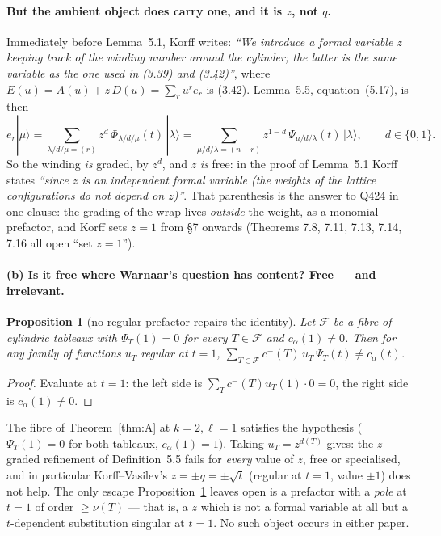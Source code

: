 \documentclass[11pt]{article}
\newtheorem{proposition}[theorem]{Proposition}
\theoremstyle{definition}
\begin{document}
\paragraph{But the ambient object does carry one, and it is $z$, not $q$.}
Immediately before Lemma~5.1, Korff writes: \emph{``We introduce a formal variable $z$
keeping track of the winding number around the cylinder; the latter is the same
variable as the one used in (3.39) and (3.42)''}, where
$E(u)=A(u)+z\,D(u)=\sum_r u^r e_r$ is (3.42).  Lemma~5.5, equation~(5.17), is then
\[
  e_r|\mu\rangle=\sum_{\lambda/d/\mu=(r)} z^{d}\,\Phi_{\lambda/d/\mu}(t)\,|\lambda\rangle
  =\sum_{\mu/d/\lambda=(n-r)} z^{1-d}\,\Psi_{\mu/d/\lambda}(t)\,|\lambda\rangle ,
  \qquad d\in\{0,1\}.
\]
So the winding \emph{is} graded, by $z^d$, and $z$ \emph{is} free: in the proof of
Lemma~5.1 Korff states \emph{``since $z$ is an independent formal variable (the weights
of the lattice configurations do not depend on $z$)''}.  That parenthesis is the answer
to Q424 in one clause: the grading of the wrap lives \emph{outside} the weight, as a
monomial prefactor, and Korff sets $z=1$ from \S7 onwards (Theorems 7.8, 7.11, 7.13,
7.14, 7.16 all open ``set $z=1$'').

\paragraph{(b) Is it free where Warnaar's question has content? Free --- and irrelevant.}

\begin{proposition}[no regular prefactor repairs the identity]\label{prop:z}
Let $\mathcal F$ be a fibre of cylindric tableaux with $\Psi_T(1)=0$ for every
$T\in\mathcal F$ and $c_\alpha(1)\ne0$.  Then for any family of functions $u_T$ regular
at $t=1$,
$\sum_{T\in\mathcal F}c^-(T)\,u_T\,\Psi_T(t)\ne c_\alpha(t)$.
\end{proposition}
\begin{proof}
Evaluate at $t=1$: the left side is $\sum_T c^-(T)u_T(1)\cdot 0=0$, the right side is
$c_\alpha(1)\ne0$.
\end{proof}

\noindent
The fibre of Theorem~\ref{thm:A} at $k=2,\ell=1$ satisfies the hypothesis
($\Psi_T(1)=0$ for both tableaux, $c_\alpha(1)=1$).  Taking $u_T=z^{d(T)}$ gives: the
$z$-graded refinement of Definition~5.5 fails for \emph{every} value of $z$, free or
specialised, and in particular Korff--Vasilev's $z=\pm q=\pm\sqrt t$ (regular at $t=1$,
value $\pm1$) does not help.  The only escape Proposition~\ref{prop:z} leaves open is a
prefactor with a \emph{pole} at $t=1$ of order $\ge\nu(T)$ --- that is, a $z$ which is
not a formal variable at all but a $t$-dependent substitution singular at $t=1$.  No
such object occurs in either paper.
\end{document}

